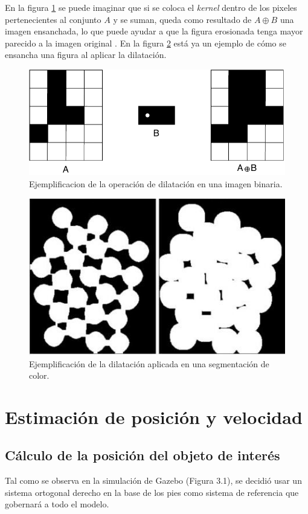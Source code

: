 \documentclass{book}
\begin{document}
En la figura \ref{fig:dilation_diagram} se puede imaginar que si se coloca el \textit{kernel} dentro de los pixeles pertenecientes al conjunto $A$ y se suman, queda como resultado de $A \oplus B$ una imagen ensanchada, lo que puede ayudar a que la figura erosionada tenga mayor parecido a la imagen original \cite{4767941}. En la figura \ref{fig:dilation_example} está ya un ejemplo de cómo se ensancha una figura al aplicar la dilatación.

\begin{figure}
\centering
\includegraphics[scale=1]{images/dilation_diagram.pdf}
\caption{Ejemplificacion de la operación de dilatación en una imagen binaria.}
\label{fig:dilation_diagram}
\end{figure}

\begin{figure}
\centering
\includegraphics[scale=0.7]{images/dilation_example.jpg}
\caption{Ejemplificación de la dilatación aplicada en una segmentación de color.}
\label{fig:dilation_example}
\end{figure}

\chapter{Estimación de posición y velocidad}
	\section{Cálculo de la posición del objeto de interés}
Tal como se observa en la simulación de Gazebo (Figura 3.1), se decidió usar un sistema ortogonal derecho en la base de los pies como sistema de referencia que gobernará a todo el modelo.
\end{document}

